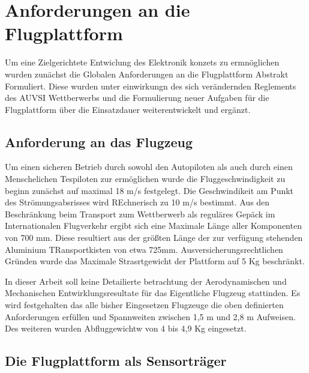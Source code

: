 \chapter{Anforderungen an die Flugplattform}\label{cha:Anforderungen an die Flugplattform}

Um eine Zielgerichtete Entwiclung des Elektronik konzets zu ermnöglichen wurden zunächst die Globalen Anforderungen an die Flugplattform Abstrakt Formuliert. Diese wurden unter einwirkungn des sich verändernden Reglements des AUVSI Wettberwerbs und die Formulierung neuer Aufgaben für die Flugplattform über die Einsatzdauer weiterentwickelt und ergänzt.  


\section{Anforderung an das Flugzeug}

Um einen sicheren Betrieb durch sowohl den Autopiloten als auch durch einen Menschelichen Tespiloten zur ermöglichen
wurde die Fluggeschwindigkeit zu beginn zunächst auf maximal 18 m/s festgelegt. Die Geschwindikeit am Punkt des Strömungsabsrisses wird REchnerisch zu 10 m/s bestimmt.
Aus den Beschränkung beim Transport zum Wettberwerb als reguläres Gepäck im Internationalen Flugverkehr ergibt sich eine Maximale Länge aller Komponenten von 700 mm. Diese resultiert aus der größten Länge der zur verfügung stehenden Aluminium
TRansportkisten von etwa 725mm.
Ausversicherungsrechtlichen Gründen wurde das Maximale Strasrtgewicht der Plattform auf 5 Kg beschränkt.

In dieser Arbeit soll keine Detailierte betrachtung der Aerodynamischen und Mechanischen Entwirklungsresultate für das Eigentliche Flugzeug stattinden. Es wird festgehalten das alle bisher Eingesetzen Flugzeuge die oben definierten Anforderungen erfüllen und Spannweiten zwischen 1,5 m und 2,8 m Aufweisen. Des weiteren wurden Abfluggewichtw von 4 bis 4,9 Kg eingesetzt.


\section{Die Flugplattform als Sensorträger}

